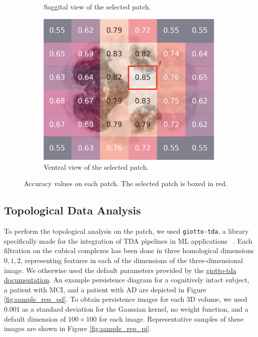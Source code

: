 \documentclass{article}
\begin{document}
\begin{figure}[b]
\begin{subfigure}{0.32\textwidth}
    \caption{Saggital view of the selected patch.}
  \end{subfigure}
  \hfill
  \begin{subfigure}{0.32\textwidth}
    \includegraphics[width=\textwidth]{figures/perf_ventral.png}
    \caption{Ventral view of the selected patch.}
  \end{subfigure}
  \caption{Accuracy values on each patch. The selected patch is boxed in red.}
  \label{fig:acc}
\end{figure}

\subsection{Topological Data Analysis}\label{sec:tda_setup}

To perform the topological analysis on the patch, we used \texttt{giotto-tda}, a library
specifically made for the integration of TDA pipelines in ML applications ~\citep{tauzin2020giottotda}. Each
filtration on the cubical complexes has been done in three homological dimensions $0,1,2$,
representing features in each of the dimensions of the three-dimensional image. We otherwise used
the default parameters provided by the
\href{https://giotto-ai.github.io/gtda-docs/latest/modules/generated/homology/gtda.homology.CubicalPersistence.html#id2}{giotto-tda
  documentation}. An example persistence diagram for a cognitively intact subject, a patient with MCI, and a
patient with AD are depicted in Figure \ref{fig:sample_rep_pd}. To obtain persistence images for each 3D
volume, we used 0.001 as a standard deviation for the Gaussian kernel, no weight function, and a
default dimension of $100 \times 100$ for each image. Representative samples of these images are
shown in Figure \ref{fig:sample_rep_pi}.
\end{document}

